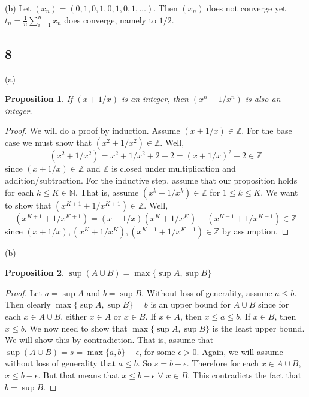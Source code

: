 \documentclass[11pt]{amsart}
\newtheorem*{prop}{Proposition}
\begin{document}
(b) Let $(x_{n}) = (0, 1, 0, 1, 0, 1, 0, 1, \hdots)$. Then $(x_{n})$ does not converge yet $t_{n} = \frac{1}{n}\sum_{i=1}^{n}x_{n}$ does converge, namely to $1/2$.

\subsection*{8} (a)
\begin{prop} 
  If $(x + 1/x)$ is an integer, then $(x^{n} + 1/x^{n})$ is also an integer.
\end{prop}
\begin{proof}
  We will do a proof by induction. Assume $(x + 1/x) \in \mathbb{Z}$. For the base case we must show that $(x^{2} + 1/x^{2}) \in \mathbb{Z}$. Well,
  \[ (x^{2} + 1/x^{2}) = x^{2} + 1/x^{2} + 2 - 2 = (x + 1/x)^{2} - 2 \in \mathbb{Z} \]
  since $(x + 1/x) \in \mathbb{Z}$ and $\mathbb{Z}$ is closed under multiplication and addition/subtraction. For the inductive step, assume that our proposition holds for each $k\leq K\in \mathbb{N}$. That is, assume $(x^{k} + 1/x^{k})\in \mathbb{Z}$ for $1\leq k \leq K$. We want to show that $(x^{K+1} + 1/x^{K+1})\in\mathbb{Z}$. Well,
  \[ (x^{K+1} + 1/x^{K+1}) = (x + 1/x)(x^{K} + 1/x^{K}) - (x^{K-1} + 1/x^{K-1}) \in\mathbb{Z} \]
  since $(x + 1/x), (x^{K} + 1/x^{K}), (x^{K-1}+1/x^{K-1})\in\mathbb{Z}$ by assumption. 
\end{proof}

(b)
\begin{prop}
  $\sup(A\cup B) = \max\{\sup A, \sup B\}$
\end{prop}
\begin{proof}
  Let $a = \sup A$ and $b = \sup B$. Without loss of generality, assume $a \leq b$. Then clearly $\max\{\sup A, \sup B\} = b$ is an upper bound for $A\cup B$ since for each $x\in A\cup B$, either $x \in A$ or $x\in B$. If $x\in A$, then $x\leq a \leq b$. If $x\in B$, then $x\leq b$. We now need to show that $\max\{\sup A, \sup B\}$ is the least upper bound. We will show this by contradiction. That is, assume that $\sup(A\cup B) = s = \max\{a,b\} - \epsilon$, for some $\epsilon > 0$. Again, we will assume without loss of generality that $a \leq b$. So $s = b - \epsilon$. Therefore for each $x\in A\cup B$, $x \leq b - \epsilon$. But that means that $x\leq b- \epsilon$ $\forall$ $x \in B$. This contradicts the fact that $b = \sup B$. 
\end{proof}
\end{document}
